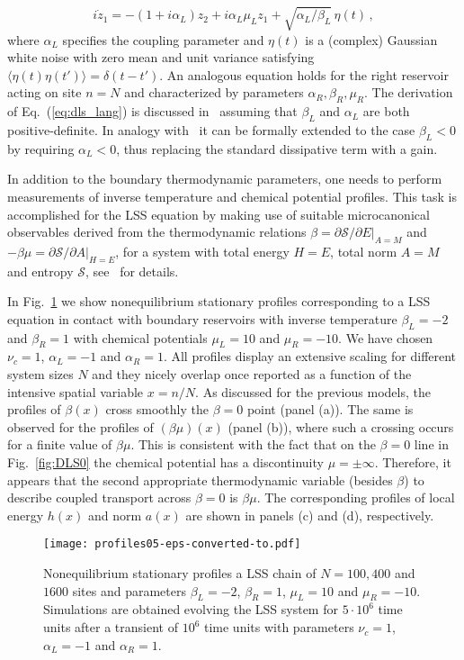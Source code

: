 \documentclass[iop, twocolumns, amssymb,notitlepage]{revtex4-1}
\newcommand{\indice}{n}
\begin{document}
\begin{equation}
\label{eq:dls_lang}
i\dot z_1 = -(1+i\alpha_L)z_2  +i\alpha_L\mu_L z_1 + \sqrt{\alpha_L / \beta_L}\, \eta(t)\,,
\end{equation}
where $\alpha_L$ specifies the coupling parameter and $\eta(t)$ is a (complex) Gaussian white noise with
zero mean and unit variance satisfying $\langle\eta(t)\eta(t') \rangle=\delta(t-t')$. An analogous equation
holds for the right reservoir acting on site $n=N$ and characterized by parameters $\alpha_R,\beta_R,\mu_R$.
The derivation of Eq.~(\ref{eq:dls_lang}) is discussed in~\cite{iubini13off} assuming that $\beta_L$ and $\alpha_L$
are both positive-definite. In analogy with~\cite{baldovin18} it can be formally extended to the case $\beta_L<0$ by
requiring  $\alpha_L<0$, thus replacing the standard dissipative term with a gain. 
 

In addition to the boundary thermodynamic parameters, one needs to perform measurements of inverse temperature
and chemical potential profiles. This task is accomplished for the LSS equation by making use of suitable microcanonical observables
derived from the thermodynamic relations $\beta=\partial \mathcal{S} / \partial E|_{A=M}$ and $-\beta\mu=\partial \mathcal{S}/\partial A|_{H=E}$,
for a system with total energy $H=E$, total norm $A=M$ and entropy $\mathcal{S}$, see~\cite{franzosi11b,iubini12} for details. 


In Fig.~\ref{fig:DLS1} we show  nonequilibrium stationary profiles corresponding to a LSS equation in contact with boundary 
reservoirs with inverse temperature $\beta_L=-2$ and $\beta_R=1$ with chemical potentials $\mu_L=10$ and $\mu_R=-10$.
We have chosen  $\nu_c=1$, $\alpha_L=-1$ and $\alpha_R=1$.
All profiles display an extensive scaling for different system sizes $N$ and they nicely overlap once reported as a function 
of the intensive spatial variable $x=\indice/N$.
As discussed for the previous models, the profiles of $\beta(x)$ cross smoothly the $\beta=0$ point (panel (a)).
The same is observed for the profiles of $(\beta\mu)(x)$ (panel (b)), where such a crossing occurs for a finite value of $\beta\mu$.
This is consistent with the fact  that on the $\beta=0$ line in Fig.~\ref{fig:DLS0} the chemical potential has a discontinuity $\mu=\pm \infty$. 
Therefore, it appears that the second appropriate thermodynamic variable  (besides $\beta$) to describe coupled transport 
across $\beta=0$ is  $\beta\mu$. The corresponding profiles of local  energy $h(x)$  and  norm $a(x)$ are shown in panels (c) and (d), 
respectively.  
%
\begin{figure}
 \centering
\texttt{[image: profiles05-eps-converted-to.pdf]}
\caption{\label{fig:DLS1} 
Nonequilibrium stationary profiles a  LSS chain of $N=100,400$ and $1600$ sites and parameters 
 $\beta_L=-2$, $\beta_R=1$, $\mu_L=10$ and $\mu_R=-10$. Simulations are obtained evolving the LSS system for
$5\cdot 10^6$ time units after a  transient of $10^6$ time units with parameters  $\nu_c=1$, $\alpha_L=-1$ and $\alpha_R=1$.}
 \end{figure}
%
\end{document}
